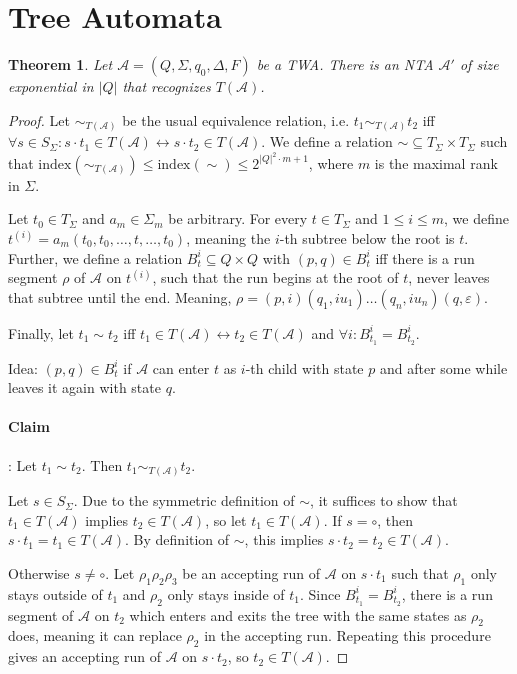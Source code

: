\documentclass{article}
\newtheorem{theorem}{Theorem}
\begin{document}
\section{Tree Automata}
\begin{theorem}
\label{twa_to_nta}
	Let $\mathcal{A} = (Q, \Sigma, q_0, \Delta, F)$ be a TWA. There is an NTA $\mathcal{A}'$ of size exponential in $|Q|$ that recognizes $T(\mathcal{A})$.
\end{theorem}
\begin{proof}
	Let $\sim_{T(\mathcal{A})}$ be the usual equivalence relation, i.e. $t_1 \sim_{T(\mathcal{A})} t_2$ iff $\forall s \in S_\Sigma: s \cdot t_1 \in T(\mathcal{A}) \leftrightarrow s \cdot t_2 \in T(\mathcal{A})$. We define a relation $\sim \subseteq T_\Sigma \times T_\Sigma$ such that $\text{index}(\sim_{T(\mathcal{A})}) \leq \text{index}(\sim) \leq 2^{|Q|^2 \cdot m + 1}$, where $m$ is the maximal rank in $\Sigma$.
	
	Let $t_0 \in T_\Sigma$ and $a_m \in \Sigma_m$ be arbitrary. For every $t \in T_\Sigma$ and $1 \leq i \leq m$, we define $t^{(i)} = a_m(t_0, t_0, \dots, t, \dots, t_0)$, meaning the $i$-th subtree below the root is $t$. Further, we define a relation $B_t^i \subseteq Q \times Q$ with $(p, q) \in B_t^i$ iff there is a run segment $\rho$ of $\mathcal{A}$ on $t^{(i)}$, such that the run begins at the root of $t$, never leaves that subtree until the end. Meaning, $\rho = (p, i) (q_1, i u_1) \dots (q_n, i u_n) (q, \varepsilon)$.
	
	Finally, let $t_1 \sim t_2$ iff $t_1 \in T(\mathcal{A}) \leftrightarrow t_2 \in T(\mathcal{A})$ and $\forall i: B^i_{t_1} = B^i_{t_2}$.
	
	Idea: $(p, q) \in B^i_t$ if $\mathcal{A}$ can enter $t$ as $i$-th child with state $p$ and after some while leaves it again with state $q$.
	
	\paragraph{Claim}: Let $t_1 \sim t_2$. Then $t_1 \sim_{T(\mathcal{A})} t_2$.
	
	Let $s \in S_\Sigma$. Due to the symmetric definition of $\sim$, it suffices to show that $t_1 \in T(\mathcal{A})$ implies $t_2 \in T(\mathcal{A})$, so let $t_1 \in T(\mathcal{A})$. If $s = \circ$, then $s \cdot t_1 = t_1 \in T(\mathcal{A})$. By definition of $\sim$, this implies $s \cdot t_2 = t_2 \in T(\mathcal{A})$.
	
	Otherwise $s \neq \circ$. Let $\rho_1 \rho_2 \rho_3$ be an accepting run of $\mathcal{A}$ on $s \cdot t_1$ such that $\rho_1$ only stays outside of $t_1$ and $\rho_2$ only stays inside of $t_1$. Since $B_{t_1}^i = B_{t_2}^i$, there is a run segment of $\mathcal{A}$ on $t_2$ which enters and exits the tree with the same states as $\rho_2$ does, meaning it can replace $\rho_2$ in the accepting run. Repeating this procedure gives an accepting run of $\mathcal{A}$ on $s \cdot t_2$, so $t_2 \in T(\mathcal{A})$.
	

\end{proof}
\end{document}

